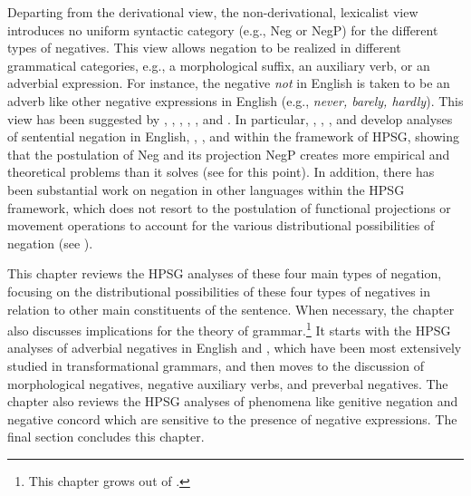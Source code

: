 \documentclass[output=paper
	        ,collection
	        ,collectionchapter
 	        ,biblatex
                ,babelshorthands
                ,newtxmath
                ,draftmode
                ,colorlinks, citecolor=brown
]{langscibook}
\begin{document}
Departing from the derivational view, the non-derivational, lexicalist view
introduces no uniform syntactic category (e.g., Neg or NegP) for the different types of negatives. This view allows negation to be realized in different grammatical categories, e.g., a morphological suffix, an auxiliary verb, or an adverbial expression. For instance, the negative \emph{not} in English is taken to be an adverb like other negative expressions in English (e.g., \textit{never, barely, hardly}). This view has been suggested by \citet{Jackendoff:72}, \citet{Baker:91}, \citet{Ernst:92}, \citet{AG:97}, \citet{Kim:00}, and \citet{Warner2000a-u}. In particular,
\citet{KS:96}, \citet{AG:97}, \citet{Kim:00}, and \citet{KS:02} develop analyses of sentential negation in English, , , and  within the framework of HPSG, showing that the postulation of Neg and its projection NegP creates more empirical and theoretical problems than it solves (see \citealt{Newmeyer:2006} for this point).
In addition, there has been substantial work on negation in other languages within the HPSG framework, which
does not resort to the postulation of functional projections or movement operations to account for the various distributional possibilities
of negation (see \citealt{PK:99, BJ:00, Prz:00, Kupsc:02, Swart:02, Borsley:05, Crysmann:10, Bender:13}).

This chapter reviews the HPSG analyses of these four main types of negation,
focusing on the distributional possibilities of these four types of negatives in
relation to other main constituents of the sentence. When
necessary, the chapter also discusses implications for
the theory of grammar.\footnote{This chapter grows out of \citet{Kim:00,kim:18}.}
It starts with the HPSG analyses of adverbial negatives in English and , which have been most extensively studied in transformational grammars,
and then moves to the discussion of morphological
negatives, negative auxiliary verbs, and preverbal negatives. The chapter
also reviews the HPSG analyses of phenomena like genitive negation and
negative concord which are sensitive to the presence of negative expressions. The
final section concludes this chapter.
\end{document}
